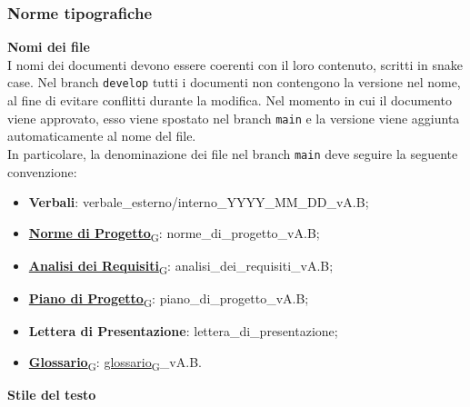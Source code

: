 \subsubsection{Norme tipografiche}
\textbf{Nomi dei file}\\ I nomi dei documenti devono essere coerenti con il loro contenuto,
scritti in snake case. Nel branch \texttt{develop} tutti i documenti non contengono la versione nel nome, al fine di evitare conflitti durante la modifica.
Nel momento in cui il documento viene approvato, esso viene spostato nel branch \texttt{main} e la versione viene aggiunta automaticamente al nome del file.\\
In particolare, la denominazione dei file nel branch \texttt{main} deve seguire la seguente convenzione:
\begin{itemize}
	\item \textbf{Verbali}: verbale\_esterno/interno\_YYYY\_MM\_DD\_vA.B;
	\item \href{https://7last.github.io/docs/rtb/documentazione-interna/glossario\#norme-di-progetto}{\textbf{Norme di Progetto}\textsubscript{G}}: norme\_di\_progetto\_vA.B;
	\item \href{https://7last.github.io/docs/rtb/documentazione-interna/glossario\#analisi-dei-requisiti}{\textbf{Analisi dei Requisiti}\textsubscript{G}}: analisi\_dei\_requisiti\_vA.B;
	\item \href{https://7last.github.io/docs/rtb/documentazione-interna/glossario\#piano-di-progetto}{\textbf{Piano di Progetto}\textsubscript{G}}: piano\_di\_progetto\_vA.B;
	\item \textbf{Lettera di Presentazione}: lettera\_di\_presentazione;
	\item \href{https://7last.github.io/docs/rtb/documentazione-interna/glossario\#glossario}{\textbf{Glossario}\textsubscript{G}}: \href{https://7last.github.io/docs/rtb/documentazione-interna/glossario\#glossario}{glossario\textsubscript{G}}\_vA.B.
\end{itemize}
\textbf{Stile del testo}
